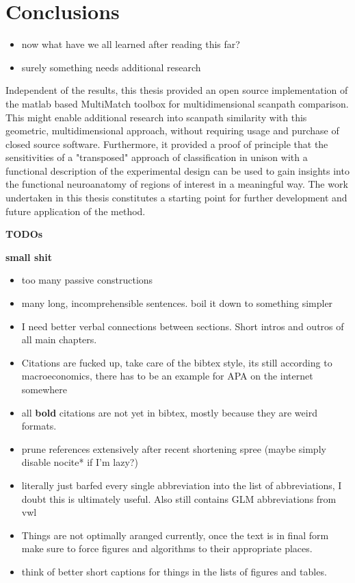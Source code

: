 \documentclass[a4paper, 12pt]{scrreprt}
\begin{document}
\section{Conclusions}
\begin{itemize}
	\item now what have we all learned after reading this far?
	\item surely something needs additional research
	
\end{itemize}
Independent of the results, this thesis provided an open source implementation of the matlab based MultiMatch toolbox for multidimensional scanpath comparison. This might enable additional research into scanpath similarity with this geometric, multidimensional approach, without requiring usage and purchase of closed source software. \newline Furthermore, it provided a proof of principle that the sensitivities of a "transposed" approach of classification in unison with a functional description of the experimental design can be used to gain insights into the functional neuroanatomy of regions of interest in a meaningful way. The work undertaken in this thesis constitutes a starting point for further development and future application of the method.




 


\textbf{TODOs}

\textbf{small shit}
\begin{itemize}
	\item too many passive constructions
	\item many long, incomprehensible sentences. boil it down to something simpler
	\item I need better verbal connections between sections. Short intros and outros of all main chapters.
	\item Citations are fucked up, take care of the bibtex style, its still according to macroeconomics, there has to be an example for APA on the internet somewhere
	\item all \textbf{bold} citations are not yet in bibtex, mostly because they are weird formats.
	\item prune references extensively after recent shortening spree (maybe simply disable nocite{*} if I'm lazy?)
	\item literally just barfed every single abbreviation into the list of abbreviations, I doubt this is ultimately useful. Also still contains GLM abbreviations from vwl
	\item Things are not optimally aranged currently, once the text is in final form make sure to force figures and algorithms to their appropriate places.
	\item think of better short captions for things in the lists of figures and tables.
\end{itemize}
\end{document}
